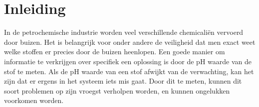 \section{Inleiding}
In de petrochemische industrie worden veel verschillende chemicaliën vervoerd door buizen.
Het is belangrijk voor onder andere de veiligheid dat men exact weet welke stoffen er precies door de buizen heenlopen. Een goede manier om informatie te verkrijgen over specifiek een oplossing is door de pH waarde van de stof te meten. Als de pH waarde van een stof afwijkt van de verwachting, kan het zijn dat er ergens in het systeem iets mis gaat. Door dit te meten, kunnen dit soort problemen op zijn vroegst verholpen worden, en kunnen ongelukken voorkomen worden.

